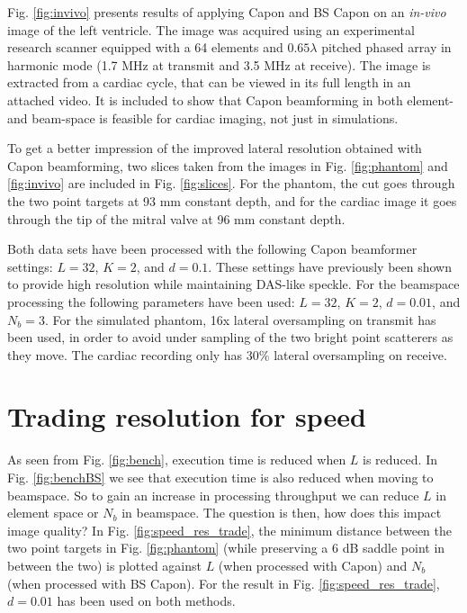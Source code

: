 \documentclass[journal]{IEEEtran}
\begin{document}
Fig. \ref{fig:invivo} presents results of applying Capon and BS Capon on an \textit{in-vivo} image of the left ventricle. The image was acquired using an experimental research scanner equipped with a 64 elements and $0.65\lambda$ pitched phased array in harmonic mode (1.7 MHz at transmit and 3.5 MHz at receive). The image is extracted from a cardiac cycle, that can be viewed in its full length in an attached video. It is included to show that Capon beamforming in both element- and beam-space is feasible for cardiac imaging, not just in simulations.

To get a better impression of the improved lateral resolution obtained with Capon beamforming, two slices taken from the images in Fig. \ref{fig:phantom} and \ref{fig:invivo} are included in Fig. \ref{fig:slices}. For the phantom, the cut goes through the two point targets at 93 mm constant depth, and for the cardiac image it goes through the tip of the mitral valve at 96 mm constant depth.

Both data sets have been processed with the following Capon beamformer settings: $L = 32$, $K = 2$, and $d=0.1$. These settings have previously been shown to provide high resolution while maintaining DAS-like speckle\cite{Synnevag2007a}. For the beamspace processing the following parameters have been used: $L=32$, $K=2$, $d=0.01$, and $N_b=3$. For the simulated phantom, 16x lateral oversampling on transmit has been used, in order to avoid under sampling of the two bright point scatterers as they move. The cardiac recording only has $30\%$ lateral oversampling on receive.

\section{Trading resolution for speed}\label{sec:trade}
As seen from Fig. \ref{fig:bench}, execution time is reduced when $L$ is reduced. In Fig. \ref{fig:benchBS} we see that execution time is also reduced when moving to beamspace. So to gain an  increase in processing throughput we can reduce $L$ in element space or $N_b$ in beamspace. The question is then, how does this impact image quality? In Fig. \ref{fig:speed_res_trade}, the minimum distance between the two point targets in Fig. \ref{fig:phantom} (while preserving a 6 dB saddle point in between the two) is plotted against $L$ (when processed with Capon) and $N_b$ (when processed with BS Capon). For the result in Fig. \ref{fig:speed_res_trade}, $d=0.01$ has been used on both methods.
\end{document}
